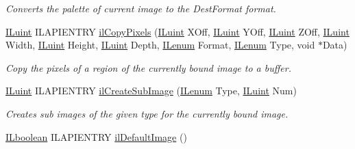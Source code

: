 \begin{DoxyCompactItemize}
\begin{DoxyCompactList}\small\item\em Converts the palette of current image to the Dest\+Format format. \end{DoxyCompactList}\item 
\hyperlink{group__il__types_gaff8e86a1072c8d7cfe387fb87c6ed8e1}{I\+Luint} I\+L\+A\+P\+I\+E\+N\+T\+R\+Y \hyperlink{group__image__manip_gaa1410977695d1633907ff371e5b9c77e}{il\+Copy\+Pixels} (\hyperlink{group__il__types_gaff8e86a1072c8d7cfe387fb87c6ed8e1}{I\+Luint} X\+Off, \hyperlink{group__il__types_gaff8e86a1072c8d7cfe387fb87c6ed8e1}{I\+Luint} Y\+Off, \hyperlink{group__il__types_gaff8e86a1072c8d7cfe387fb87c6ed8e1}{I\+Luint} Z\+Off, \hyperlink{group__il__types_gaff8e86a1072c8d7cfe387fb87c6ed8e1}{I\+Luint} Width, \hyperlink{group__il__types_gaff8e86a1072c8d7cfe387fb87c6ed8e1}{I\+Luint} Height, \hyperlink{group__il__types_gaff8e86a1072c8d7cfe387fb87c6ed8e1}{I\+Luint} Depth, \hyperlink{group__il__types_ga62ca73445716183ef42b1f3906a45ed0}{I\+Lenum} Format, \hyperlink{group__il__types_ga62ca73445716183ef42b1f3906a45ed0}{I\+Lenum} Type, void $\ast$Data)
\begin{DoxyCompactList}\small\item\em Copy the pixels of a region of the currently bound image to a buffer. \end{DoxyCompactList}\item 
\hyperlink{group__il__types_gaff8e86a1072c8d7cfe387fb87c6ed8e1}{I\+Luint} I\+L\+A\+P\+I\+E\+N\+T\+R\+Y \hyperlink{group__image__manip_gabc158c1aed9358ad456527f7cdb03446}{il\+Create\+Sub\+Image} (\hyperlink{group__il__types_ga62ca73445716183ef42b1f3906a45ed0}{I\+Lenum} Type, \hyperlink{group__il__types_gaff8e86a1072c8d7cfe387fb87c6ed8e1}{I\+Luint} Num)
\begin{DoxyCompactList}\small\item\em Creates sub images of the given type for the currently bound image. \end{DoxyCompactList}\item 
\hypertarget{group__image__manip_ga3084506414c867df1f37234d996e2501}{\hyperlink{group__il__types_gaa6aa7c95cfdc06b4d8601ef832b7bb0a}{I\+Lboolean} I\+L\+A\+P\+I\+E\+N\+T\+R\+Y \hyperlink{group__image__manip_ga3084506414c867df1f37234d996e2501}{il\+Default\+Image} ()}\label{group__image__manip_ga3084506414c867df1f37234d996e2501}


\end{DoxyCompactItemize}
